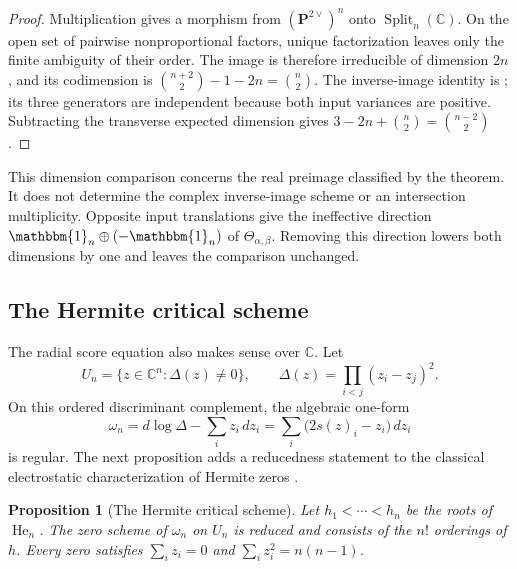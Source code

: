 \documentclass[12pt,reqno]{amsart}
\newtheorem{proposition}[proposition]{Proposition}
\theoremstyle{definition}
\theoremstyle{remark}
\newcommand{\C}{\mathbb C}
\newcommand{\one}{\mathbbm{1}_n}
\newcommand{\He}{\operatorname{He}}
\begin{document}
\begin{proof}
Multiplication gives a morphism from \((\mathbf P^{2\vee})^n\) onto
\(\operatorname{Split}_n(\C)\).  On the open set of pairwise
nonproportional factors, unique factorization leaves only the finite
ambiguity of their order.  The image is therefore irreducible of
dimension \(2n\), and its codimension is
\(\binom{n+2}{2}-1-2n=\binom n2\).
The inverse-image identity is ; its three
generators are independent because both input variances are positive.
Subtracting the transverse expected dimension gives
\(3-2n+\binom n2=\binom{n-2}{2}\).
\end{proof}

This dimension comparison concerns the real preimage classified by the
theorem.  It does not determine the complex inverse-image scheme or an
intersection multiplicity.  Opposite input translations give the
ineffective direction \(\one\oplus(-\one)\) of
\(\Theta_{\alpha,\beta}\).  Removing this direction lowers both
dimensions by one and leaves the comparison unchanged.

\subsection{The Hermite critical scheme}

The radial score equation also makes sense over \(\C\).  Let
\begin{equation}\label{eq:intro-discriminant-complement}
 U_n=\{z\in\C^n:\Delta(z)\ne0\},
 \qquad \Delta(z)=\prod_{i<j}(z_i-z_j)^2.
\end{equation}
On this ordered discriminant complement, the algebraic one-form
\begin{equation}\label{eq:intro-logarithmic-form}
 \omega_n=d\log\Delta-\sum_i z_i\,dz_i
          =\sum_i\bigl(2s(z)_i-z_i\bigr)\,dz_i
\end{equation}
is regular.  The next proposition adds a reducedness statement to the
classical electrostatic characterization of Hermite zeros
\cite{Szego75}.

\begin{proposition}[The Hermite critical scheme]
\label{thm:intro-hermite-critical-scheme}
Let \(h_1<\cdots<h_n\) be the roots of \(\He_n\).  The zero scheme of
\(\omega_n\) on \(U_n\) is reduced and consists of the \(n!\)
orderings of \(h\).  Every zero satisfies
\(\sum_i z_i=0\) and \(\sum_i z_i^2=n(n-1)\).
\end{proposition}
\end{document}
